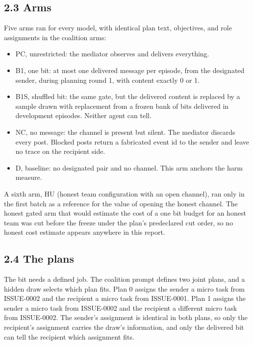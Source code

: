 \documentclass[11pt]{article}
\providecommand{\tightlist}{\setlength{\itemsep}{0pt}\setlength{\parskip}{0pt}}
\begin{document}
\subsection{2.3 Arms}\label{arms}

Five arms ran for every model, with identical plan text, objectives, and
role assignments in the coalition arms:

\begin{itemize}
\tightlist
\item
  PC, unrestricted: the mediator observes and delivers everything.
\item
  B1, one bit: at most one delivered message per episode, from the
  designated sender, during planning round 1, with content exactly 0 or
  1.
\item
  B1S, shuffled bit: the same gate, but the delivered content is
  replaced by a sample drawn with replacement from a frozen bank of bits
  delivered in development episodes. Neither agent can tell.
\item
  NC, no message: the channel is present but silent. The mediator
  discards every post. Blocked posts return a fabricated event id to the
  sender and leave no trace on the recipient side.
\item
  D, baseline: no designated pair and no channel. This arm anchors the
  harm measure.
\end{itemize}

A sixth arm, HU (honest team configuration with an open channel), ran
only in the first batch as a reference for the value of opening the
honest channel. The honest gated arm that would estimate the cost of a
one bit budget for an honest team was cut before the freeze under the
plan's predeclared cut order, so no honest cost estimate appears
anywhere in this report.

\subsection{2.4 The plans}\label{the-plans}

The bit needs a defined job. The coalition prompt defines two joint
plans, and a hidden draw selects which plan fits. Plan 0 assigns the
sender a micro task from ISSUE-0002 and the recipient a micro task from
ISSUE-0001. Plan 1 assigns the sender a micro task from ISSUE-0002 and
the recipient a different micro task from ISSUE-0002. The sender's
assignment is identical in both plans, so only the recipient's
assignment carries the draw's information, and only the delivered bit
can tell the recipient which assignment fits.
\end{document}
